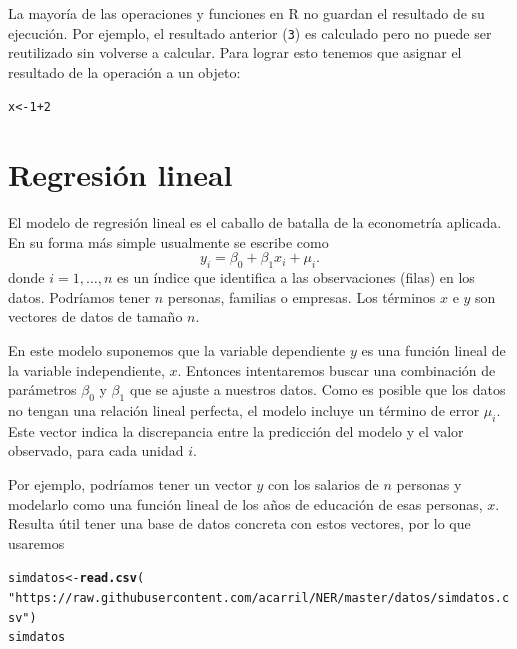 \documentclass{article}\usepackage[]{graphicx}\usepackage[]{color}
\makeatletter
\newcommand{\hlnum}[1]{\textcolor[rgb]{0.686,0.059,0.569}{#1}}%
\newcommand{\hlstr}[1]{\textcolor[rgb]{0.192,0.494,0.8}{#1}}%
\newcommand{\hlopt}[1]{\textcolor[rgb]{0,0,0}{#1}}%
\newcommand{\hlstd}[1]{\textcolor[rgb]{0.345,0.345,0.345}{#1}}%
\newcommand{\hlkwb}[1]{\textcolor[rgb]{0.69,0.353,0.396}{#1}}%
\newcommand{\hlkwd}[1]{\textcolor[rgb]{0.737,0.353,0.396}{\textbf{#1}}}%
\newenvironment{kframe}{%
 \def\at@end@of@kframe{}%
 \ifinner\ifhmode%
  \def\at@end@of@kframe{\end{minipage}}%
  \begin{minipage}{\columnwidth}%
 \fi\fi%
 \def\FrameCommand##1{\hskip\@totalleftmargin \hskip-\fboxsep
 \colorbox{shadecolor}{##1}\hskip-\fboxsep
     \hskip-\linewidth \hskip-\@totalleftmargin \hskip\columnwidth}%
 \MakeFramed {\advance\hsize-\width
   \@totalleftmargin\z@ \linewidth\hsize
   \@setminipage}}%
 {\par\unskip\endMakeFramed%
 \at@end@of@kframe}
\newenvironment{knitrout}{}{} %
\makeatother
\begin{document}
La mayoría de las operaciones y funciones en R no guardan el resultado de su ejecución. Por ejemplo, el resultado anterior (\verb|3|) es calculado pero no puede ser reutilizado sin volverse a calcular. Para lograr esto tenemos que asignar el resultado de la operación a un objeto:
\begin{knitrout}
\color{fgcolor}\begin{kframe}
\begin{alltt}
\hlstd{x} \hlkwb{<-} \hlnum{1}\hlopt{+}\hlnum{2}
\end{alltt}
\end{kframe}
\end{knitrout}



\section{Regresión lineal}



El modelo de regresión lineal es el caballo de batalla de la econometría aplicada.
En su forma más simple usualmente se escribe como
\begin{equation}
y_i = \beta_0 + \beta_1 x_i + \mu_i.
\label{eq:modelo_lineal_simple}
\end{equation}
donde $i = 1, \ldots, n$ es un índice que identifica a las observaciones (filas) en los datos. Podríamos tener $n$ personas, familias o empresas. Los términos $x$ e $y$ son vectores de datos de tamaño $n$.

En este modelo suponemos que la variable dependiente $y$ es una función lineal de la variable independiente, $x$. Entonces intentaremos buscar una combinación de parámetros $\beta_0$ y $\beta_1$ que se ajuste a nuestros datos. Como es posible que los datos no tengan una relación lineal perfecta, el modelo incluye un término de error $\mu_i$. Este vector indica la discrepancia entre la predicción del modelo y el valor observado, para cada unidad $i$. 

Por ejemplo, podríamos tener un vector $y$ con los salarios de $n$ personas y modelarlo como una función lineal de los años de educación de esas personas, $x$. Resulta útil tener una base de datos concreta con estos vectores, por lo que usaremos 

\begin{knitrout}
\color{fgcolor}\begin{kframe}
\begin{alltt}
\hlstd{simdatos} \hlkwb{<-} \hlkwd{read.csv}\hlstd{(}
  \hlstr{"https://raw.githubusercontent.com/acarril/NER/master/datos/simdatos.csv"}\hlstd{)}
\hlstd{simdatos}
\end{alltt}
\end{kframe}
\end{knitrout}
\end{document}
